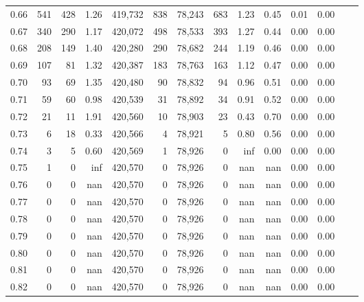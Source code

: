 \begin{tabular}{rrrrrrrrrrrrrr}
0.66 &     541 &    428 &    1.26 &  419,732 &      838 &  78,243 &     683 &  1.23 &  0.45 &  0.01 &      0.00 \\
0.67 &     340 &    290 &    1.17 &  420,072 &      498 &  78,533 &     393 &  1.27 &  0.44 &  0.00 &      0.00 \\
0.68 &     208 &    149 &    1.40 &  420,280 &      290 &  78,682 &     244 &  1.19 &  0.46 &  0.00 &      0.00 \\
0.69 &     107 &     81 &    1.32 &  420,387 &      183 &  78,763 &     163 &  1.12 &  0.47 &  0.00 &      0.00 \\
0.70 &      93 &     69 &    1.35 &  420,480 &       90 &  78,832 &      94 &  0.96 &  0.51 &  0.00 &      0.00 \\
0.71 &      59 &     60 &    0.98 &  420,539 &       31 &  78,892 &      34 &  0.91 &  0.52 &  0.00 &      0.00 \\
0.72 &      21 &     11 &    1.91 &  420,560 &       10 &  78,903 &      23 &  0.43 &  0.70 &  0.00 &      0.00 \\
0.73 &       6 &     18 &    0.33 &  420,566 &        4 &  78,921 &       5 &  0.80 &  0.56 &  0.00 &      0.00 \\
0.74 &       3 &      5 &    0.60 &  420,569 &        1 &  78,926 &       0 &   inf &  0.00 &  0.00 &      0.00 \\
0.75 &       1 &      0 &     inf &  420,570 &        0 &  78,926 &       0 &   nan &   nan &  0.00 &      0.00 \\
0.76 &       0 &      0 &     nan &  420,570 &        0 &  78,926 &       0 &   nan &   nan &  0.00 &      0.00 \\
0.77 &       0 &      0 &     nan &  420,570 &        0 &  78,926 &       0 &   nan &   nan &  0.00 &      0.00 \\
0.78 &       0 &      0 &     nan &  420,570 &        0 &  78,926 &       0 &   nan &   nan &  0.00 &      0.00 \\
0.79 &       0 &      0 &     nan &  420,570 &        0 &  78,926 &       0 &   nan &   nan &  0.00 &      0.00 \\
0.80 &       0 &      0 &     nan &  420,570 &        0 &  78,926 &       0 &   nan &   nan &  0.00 &      0.00 \\
0.81 &       0 &      0 &     nan &  420,570 &        0 &  78,926 &       0 &   nan &   nan &  0.00 &      0.00 \\
0.82 &       0 &      0 &     nan &  420,570 &        0 &  78,926 &       0 &   nan &   nan &  0.00 &      0.00 \\

\end{tabular}
